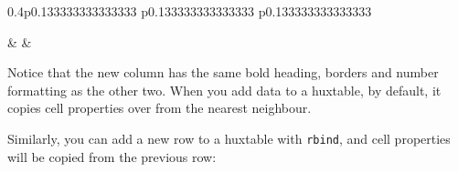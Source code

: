\documentclass[]{article}
\newenvironment{Shaded}{\begin{snugshade}}{\end{snugshade}}
\newcommand{\FloatTok}[1]{\textcolor[rgb]{0.00,0.00,0.81}{#1}}
\newcommand{\KeywordTok}[1]{\textcolor[rgb]{0.13,0.29,0.53}{\textbf{#1}}}
\newcommand{\NormalTok}[1]{#1}
\newcommand{\StringTok}[1]{\textcolor[rgb]{0.31,0.60,0.02}{#1}}
\begin{document}
\begin{table}[ht]
\begin{centerbox}
\begin{threeparttable}
\begin{tabularx}{0.4\textwidth}{p{} p{} p{}}
\hhline{}

 &
 &
 \tabularnewline[-0.5pt]


\hhline{}
\end{tabularx}
\end{threeparttable}\par\end{centerbox}

\end{table}
 

\FloatBarrier

Notice that the new column has the same bold heading, borders and number
formatting as the other two. When you add data to a huxtable, by
default, it copies cell properties over from the nearest neighbour.

Similarly, you can add a new row to a huxtable with \texttt{rbind}, and
cell properties will be copied from the previous row:

\begin{Shaded}
\end{Shaded}

 
  \providecommand{\huxb}[2]{\arrayrulecolor[RGB]{#1}\global\arrayrulewidth=#2pt}
  \providecommand{\huxvb}[2]{\color[RGB]{#1}\vrule width #2pt}
  \providecommand{\huxtpad}[1]{\rule{0pt}{#1}}
  \providecommand{\huxbpad}[1]{\rule[-#1]{0pt}{#1}}
\end{document}
